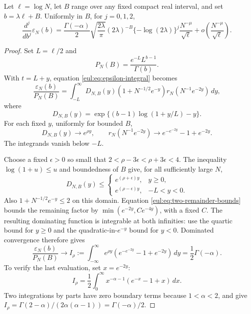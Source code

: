 \begin{lemma}
\label{eul:lem:transition-C2}
Let $\ell=\log N$, let $B$ range over any fixed compact real interval,
and set $b=\lambda\ell+B$.  Uniformly in $B$, for $j=0,1,2$,
\begin{equation}\label{eul:eq:epsilon-C2}
 \frac{d^j}{db^j}\varepsilon_N(b)
 =\frac{\Gamma(-\alpha)}2\sqrt{\frac{2\lambda}{\pi}}
  (2\lambda)^{-B}\{-\log(2\lambda)\}^{j}
  \frac{N^{-\mu}}{\sqrt\ell}
  +o\!\left(\frac{N^{-\mu}}{\sqrt\ell}\right).
\end{equation}
\end{lemma}
\begin{proof}
Set $L=\ell/2$ and
\[
 P_N(B)=\frac{e^{-L}L^{b-1}}{\Gamma(b)}.
\]
With $t=L+y$, equation \eqref{eul:eq:epsilon-integral} becomes
\begin{equation}\label{eul:eq:transition-rescaling}
 \frac{\varepsilon_N(b)}{P_N(B)}
 =\int_{-L}^\infty D_{N,B}(y)
       (1+N^{-1/2}e^{-y})r_N(N^{-1}e^{-2y})\,dy,
\end{equation}
where
\[
 D_{N,B}(y)=
  \exp\{(b-1)\log(1+y/L)-y\}.
\]
For each fixed $y$, uniformly for bounded $B$,
\[
 D_{N,B}(y)\longrightarrow e^{\rho y},\qquad
 r_N(N^{-1}e^{-2y})\longrightarrow
              e^{-e^{-2y}}-1+e^{-2y}.
\]
The integrands vanish below $-L$.

Choose a fixed $\epsilon>0$ so small that
$2<\rho-3\epsilon<\rho+3\epsilon<4$.
The inequality $\log(1+u)\leq u$ and boundedness of $B$ give, for
all sufficiently large $N$,
\[
 D_{N,B}(y)\leq
 \begin{cases}
   e^{(\rho+\epsilon)y},&y\geq0,\\
   e^{(\rho-\epsilon)y},&-L<y<0.
 \end{cases}
\]
Also $1+N^{-1/2}e^{-y}\leq2$ on this domain.  Equation
\eqref{eul:eq:two-remainder-bounds} bounds the remaining factor by
$\min(e^{-2y},C e^{-4y})$, with a fixed $C$.
The resulting dominating function is integrable at both infinities:
use the quartic bound for $y\geq0$ and the quadratic-in-$e^{-y}$
bound for $y<0$.  Dominated convergence therefore gives
\begin{equation}\label{eul:eq:Mellin-limit}
 \frac{\varepsilon_N(b)}{P_N(B)}
 \longrightarrow
 I_\rho:=\int_{-\infty}^{\infty}
      e^{\rho y}(e^{-e^{-2y}}-1+e^{-2y})\,dy
 =\frac12\Gamma(-\alpha).
\end{equation}
To verify the last evaluation, set $x=e^{-2y}$:
\[
 I_\rho=\frac12\int_0^\infty
          x^{-\alpha-1}(e^{-x}-1+x)\,dx.
\]
Two integrations by parts have zero boundary terms because
$1<\alpha<2$, and give
$I_\rho=\Gamma(2-\alpha)/(2\alpha(\alpha-1))
       =\Gamma(-\alpha)/2$.


\end{proof}
